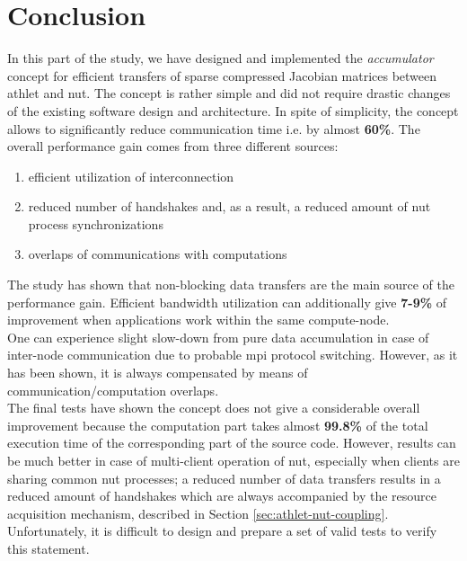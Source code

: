 \section{Conclusion}
\label{sec:accumulator-conclusions}


In this part of the study, we have designed and implemented the \textit{accumulator} concept for efficient transfers of sparse compressed Jacobian matrices between \acrshort{athlet} and \acrshort{nut}. The concept is rather simple and did not require drastic changes of the existing software design and architecture. In spite of simplicity, the concept allows to significantly reduce communication time i.e. by almost \textbf{60\%}. The overall performance gain comes from three different sources: 

\begin{enumerate}
	\item efficient utilization of interconnection
	\item reduced number of handshakes and, as a result, a reduced amount of \acrshort{nut} process synchronizations
	\item overlaps of communications with computations
\end{enumerate}

The study has shown that non-blocking data transfers are the main source of the performance gain. Efficient bandwidth utilization can additionally give \textbf{7-9\%} of improvement when applications work within the same compute-node.\\


One can experience slight slow-down from pure data accumulation in case of inter-node communication due to probable \acrshort{mpi} protocol switching. However, as it has been shown, it is always compensated by means of communication/computation overlaps.\\


The final tests have shown the concept does not give a considerable overall improvement because the computation part takes almost \textbf{99.8\%} of the total execution time of the corresponding part of the source code. However, results can be much better in case of multi-client operation of \acrshort{nut}, especially when clients are sharing common \acrshort{nut} processes; a reduced number of data transfers results in a reduced amount of handshakes which are always accompanied by the resource acquisition mechanism, described in Section \ref{sec:athlet-nut-coupling}. Unfortunately, it is difficult to design and prepare a set of valid tests to verify this statement. \\


